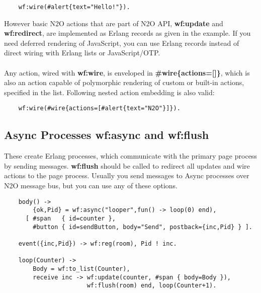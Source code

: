 \vspace{1\baselineskip}
\begin{lstlisting}
    wf:wire(#alert{text="Hello!"}).
\end{lstlisting}
\vspace{1\baselineskip}

However basic N2O actions that are part of N2O API, {\bf wf:update} and {\bf wf:redirect},
are implemented as Erlang records as given in the example. If you need deferred
rendering of JavaScript, you can use Erlang records instead of direct wiring with
Erlang lists or JavaScript/OTP.

\paragraph{}
Any action, wired with {\bf wf:wire}, is enveloped in {\bf \#wire\{actions=[]\}},
which is also an action capable of polymorphic rendering of custom or built-in actions, specified in the list.
Following nested action embedding is also valid:

\vspace{1\baselineskip}
\begin{lstlisting}
    wf:wire(#wire{actions=[#alert{text="N2O"}]}).
\end{lstlisting}
\vspace{1\baselineskip}

\subsection{Async Processes {\bf wf:async} and {\bf wf:flush}}
These create Erlang processes, which communicate with the primary page
process by sending messages. {\bf wf:flush} should be called to redirect all updates and
wire actions to the page process.
Usually you send messages to Async processes over N2O
message bus, but you can use any of these options.

\vspace{1\baselineskip}
\begin{lstlisting}
    body() ->
        {ok,Pid} = wf:async("looper",fun() -> loop(0) end),
      [ #span   { id=counter },
        #button { id=sendButton, body="Send", postback={inc,Pid} } ].

    event({inc,Pid}) -> wf:reg(room), Pid ! inc.

    loop(Counter) ->
        Body = wf:to_list(Counter),
        receive inc -> wf:update(counter, #span { body=Body }),
                       wf:flush(room) end, loop(Counter+1).
\end{lstlisting}


